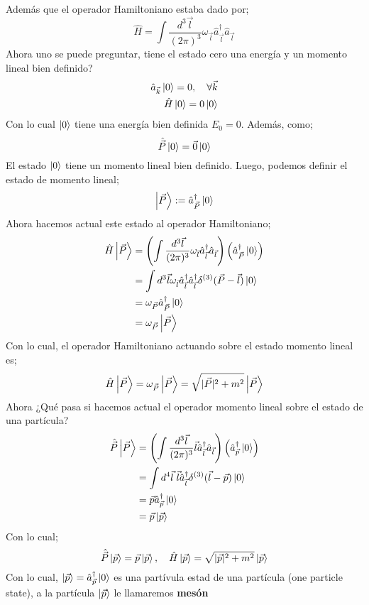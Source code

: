 \documentclass[../main.tex]{subfiles}
\begin{document}
 Además que el operador Hamiltoniano estaba dado por;
 \begin{equation}
   \hat{H} = \int \frac{d^3\vec{l}}{(2\pi)^3} \omega_{\vec{l}}\hat{a}^\dagger_{\vec{l}} \hat{a}_{\vec{l}}
  \end{equation}
  Ahora uno se puede preguntar, tiene el estado cero una energía y un momento lineal bien definido?
  \begin{align*}
    \hat{a}_{\vec{k}} \ket{0} = 0, \quad \forall \vec{k} \\
    \hat{H}\ket{0} = 0 \ket{0}
  \end{align*}
  Con lo cual $\ket{0}$ tiene una energía bien definida $E_0=0$.
  Además, como;
  \begin{equation}
    \hat{\vec{P}}\ket{0} = \vec{0}\ket{0}
   \end{equation}
   El estado $\ket{0}$ tiene un momento lineal bien definido. Luego, podemos definir el estado de momento lineal;
   \begin{equation}
     \ket{\vec{P}} := \hat{a}^\dagger_{\vec{P}}\ket{0}
    \end{equation}
    Ahora hacemos actual este estado al operador Hamiltoniano;
    \begin{align*}
      \hat{H} \ket{\vec{P}}& = \left( \int \frac{d^3\vec{l}}{(2\pi)^3} \omega_{\vec{l}} \hat{a}^\dagger_{\vec{l}} \hat{a}_{\vec{l}} \right)\left( \hat{a}^\dagger_{\vec{P}} \ket{0}\right)  \\
      & = \int d^3\vec{l} \omega_{\vec{l}}\hat{a}^\dagger_{\vec{l}} \hat{a}^\dagger_{\vec{l}} \delta^{(3)}(\vec{P}-\vec{l}) \ket{0} \\
      & = \omega_{\vec{P}} \hat{a}^\dagger_{\vec{P}}\ket{0} \\
      & = \omega_{\vec{P}}\ket{\vec{P}}
    \end{align*}
    Con lo cual, el operador Hamiltoniano actuando sobre el estado momento lineal es;
    \begin{equation}
      \hat{H}\ket{\vec{P}} = \omega_{\vec{P}}\ket{\vec{P}} = \sqrt{|\vec{P}|^2+ m^2}\ket{\vec{P}}
    \end{equation}
Ahora ¿Qué pasa si hacemos actual el operador momento lineal sobre el estado de una partícula?
\begin{align*}
  \hat{\vec{P}}\ket{\vec{P}} & = \left(\int \frac{d^3\vec{l}}{(2\pi)^3} \vec{l}\hat{a}^\dagger_{\vec{l}}\hat{a}_{\vec{l}} \right)\left( \hat{a}^\dagger_{\vec{p}}\ket{0} \right) \\
  & = \int d^4\vec{l}\; \vec{l}\hat{a}^\dagger_{\vec{l}} \delta^{(3)}(\vec{l}-\vec{p}) \ket{0} \\
  & = \vec{p}\hat{a}^\dagger_{\vec{p}}\ket{0} \\
  & = \vec{p}\ket{\vec{p}}
\end{align*}
Con lo cual;
\begin{equation}
  \hat{\vec{P}}\ket{\vec{p}} = \vec{p}\ket{\vec{p}}, \quad \hat{H} \ket{\vec{p}} = \sqrt{|\vec{p}|^2 + m^2} \ket{\vec{p}}
 \end{equation}
Con lo cual, $\ket{\vec{p}}=\hat{a}_{\vec{p}}^\dagger \ket{0}$ es una partívula estad de una partícula (one particle state), a la partícula $\ket{\vec{p}}$ le llamaremos \textbf{mesón}
\end{document}
